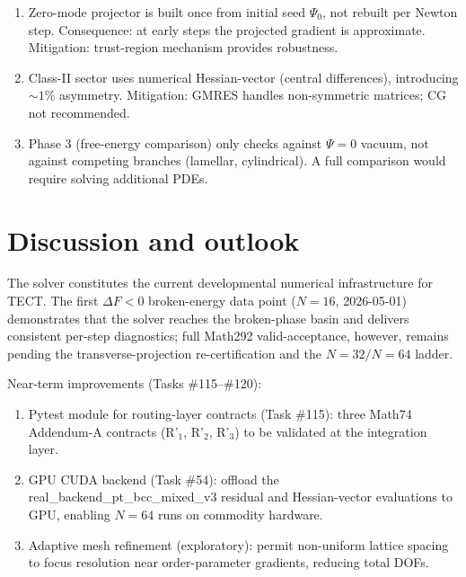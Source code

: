 \begin{enumerate}
\item Zero-mode projector is built once from initial seed $\Psi_0$, not
rebuilt per Newton step. Consequence: at early steps the projected gradient
is approximate. Mitigation: trust-region mechanism provides robustness.

\item Class-II sector uses numerical Hessian-vector (central differences),
introducing $\sim 1\%$ asymmetry. Mitigation: GMRES handles non-symmetric
matrices; CG not recommended.

\item Phase 3 (free-energy comparison) only checks against $\Psi = 0$ vacuum,
not against competing branches (lamellar, cylindrical). A full comparison
would require solving additional PDEs.
\end{enumerate}

\section{Discussion and outlook}

The solver constitutes the current developmental numerical
infrastructure for TECT. The first $\Delta F<0$ broken-energy data
point ($N=16$, 2026-05-01) demonstrates that the solver reaches the
broken-phase basin and delivers consistent per-step diagnostics; full
Math292 valid-acceptance, however, remains pending the
transverse-projection re-certification and the $N=32/N=64$ ladder.

Near-term improvements (Tasks \#115--\#120):

\begin{enumerate}
\item Pytest module for routing-layer contracts (Task \#115): three Math74
Addendum-A contracts (R'$_1$, R'$_2$, R'$_3$) to be validated at the integration layer.

\item GPU CUDA backend (Task \#54): offload the real\_backend\_pt\_bcc\_mixed\_v3
residual and Hessian-vector evaluations to GPU, enabling $N=64$ runs on
commodity hardware.

\item Adaptive mesh refinement (exploratory): permit non-uniform lattice
spacing to focus resolution near order-parameter gradients, reducing total
DOFs.
\end{enumerate}

